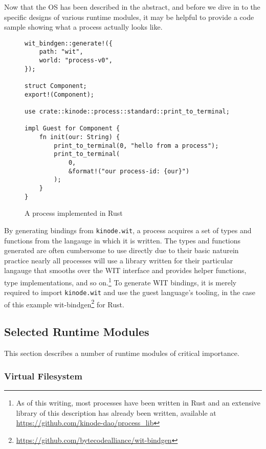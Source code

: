 \documentclass[runningheads]{llncs}
\begin{document}
Now that the OS has been described in the abstract, and before we dive in to the specific designs of various runtime modules, it may be helpful to provide a code sample showing what a process actually looks like.

\begin{figure}[H]
\begin{verbatim}
wit_bindgen::generate!({
    path: "wit",
    world: "process-v0",
});

struct Component;
export!(Component);

use crate::kinode::process::standard::print_to_terminal;

impl Guest for Component {
    fn init(our: String) {
        print_to_terminal(0, "hello from a process");
        print_to_terminal(
            0,
            &format!("our process-id: {our}")
        );
    }
}
\end{verbatim}
    \caption{A process implemented in Rust}
    \label{fig:example process}
\end{figure}

By generating bindings from \verb|kinode.wit|, a process acquires a set of types and functions from the langauge in which it is written.
The types and functions generated are often cumbersome to use directly due to their basic nature\textemdash in practice nearly all processes will use a library written for their particular langauge that smooths over the WIT interface and provides helper functions, type implementations, and so on.\footnote{ As of this writing, most processes have been written in Rust and an extensive library of this description has already been written, available at \url{https://github.com/kinode-dao/process\_lib} }
To generate WIT bindings, it is merely required to import \verb|kinode.wit| and use the guest language's tooling, in the case of this example wit-bindgen\footnote{\url{https://github.com/bytecodealliance/wit-bindgen}} for Rust.

\subsection{Selected Runtime Modules}
\label{sec:osmodules}

This section describes a number of runtime modules of critical importance.

\subsubsection{Virtual Filesystem}
\label{sec:osvfs}
\end{document}
